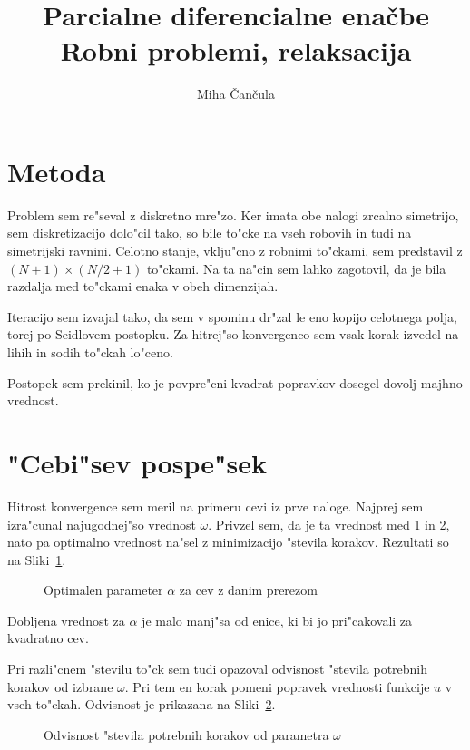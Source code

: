 \documentclass[a4paper,10pt]{article}
\title{Parcialne diferencialne ena\v cbe \\ Robni problemi, relaksacija}
\author{Miha \v Can\v cula}
\begin{document}
\maketitle

\section{Metoda}

Problem sem re"seval z diskretno mre"zo. Ker imata obe nalogi zrcalno simetrijo, sem diskretizacijo dolo"cil tako, so bile to"cke na vseh robovih in tudi na simetrijski ravnini. Celotno stanje, vklju"cno z robnimi to"ckami, sem predstavil z $(N+1) \times (N/2+1)$ to"ckami. Na ta na"cin sem lahko zagotovil, da je bila razdalja med to"ckami enaka v obeh dimenzijah. 

Iteracijo sem izvajal tako, da sem v spominu dr"zal le eno kopijo celotnega polja, torej po Seidlovem postopku. Za hitrej"so konvergenco sem vsak korak izvedel na lihih in sodih to"ckah lo"ceno. 

Postopek sem prekinil, ko je povpre"cni kvadrat popravkov dosegel dovolj majhno vrednost. 

\section{"Cebi"sev pospe"sek}

Hitrost konvergence sem meril na primeru cevi iz prve naloge. Najprej sem izra"cunal najugodnej"so vrednost $\omega$. Privzel sem, da je ta vrednost med 1 in 2, nato pa optimalno vrednost na"sel z minimizacijo "stevila korakov. Rezultati so na Sliki~\ref{fig:omega-min}. 

\begin{figure}[H]
  
  \caption{Optimalen parameter $\alpha$ za cev z danim prerezom}
  \label{fig:omega-min}
\end{figure}

Dobljena vrednost za $\alpha$ je malo manj"sa od enice, ki bi jo pri"cakovali za kvadratno cev. 

Pri razli"cnem "stevilu to"ck sem tudi opazoval odvisnost "stevila potrebnih korakov od izbrane $\omega$. Pri tem en korak pomeni popravek vrednosti funkcije $u$ v vseh to"ckah. Odvisnost je prikazana na Sliki~\ref{fig:omega}. 

\begin{figure}[H]
  
  \caption{Odvisnost "stevila potrebnih korakov od parametra $\omega$}
  \label{fig:omega}
\end{figure}
\end{document}
